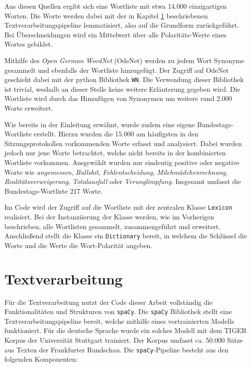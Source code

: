 Aus diesen Quellen ergibt sich eine Wortliste mit etwa 14.000 einzigartigen Worten. 
Die Worte werden dabei mit der in Kapitel \ref{g3textv} beschriebenen Textverarbeitungspipeline lemmatisiert, also auf die Grundform zurückgeführt. 
Bei Überschneidungen wird ein Mittelwert über alle Polaritäts-Werte eines Wortes gebildet. 

Mithilfe des \textit{Open German WordNet} (OdeNet) werden zu jedem Wort Synonyme gesammelt und ebenfalls der Wortliste hinzugefügt. 
Der Zugriff auf OdeNet geschieht dabei mit der python Bibliothek \texttt{WN}. 
Die Verwendung dieser Bibliothek ist trivial, weshalb an dieser Stelle keine weitere Erläuterung gegeben wird. 
Die Wortliste wird durch das Hinzufügen von Synonymen um weitere rund 2.000 Worte erweitert. 

Wie bereits in der Einleitung erwähnt, wurde zudem eine eigene Bundestags-Wortliste erstellt. 
Hierzu wurden die 15.000 am häufigsten in den Sitzungsprotokollen vorkommenden Worte erfasst und analysiert. 
Dabei wurden jedoch nur jene Worte betrachtet, welche nicht bereits in der kombinierten Wortliste vorkommen. 
Ausgewählt wurden nur eindeutig positive oder negative Worte wie \textit{angemessen}, \textit{Bullshit}, \textit{Fehlentscheidung}, \textit{Milchmädchenrechnung}, \textit{Realitätsverweigerung}, \textit{Totalausfall} oder \textit{Verunglimpfung}. 
Insgesamt umfasst die Bundestags-Wortliste 217 Worte. 

Im Code wird der Zugriff auf die Wortliste mit der zentralen Klasse \texttt{Lexicon} realisiert. 
Bei der Instanziierung der Klasse werden, wie im Vorherigen beschrieben, alle Wortlisten gesammelt, zusammengeführt und erweitert. 
Anschließend stellt die Klasse ein \texttt{Dictionary} bereit, in welchem die Schlüssel die Worte und die Werte die Wort-Polarität angeben. 

\section{Textverarbeitung}
\label{g3textv}
Für die Textverarbeitung nutzt der Code dieser Arbeit vollständig die Funktionalitäten und Strukturen von \texttt{spaCy}. 
Die \texttt{spaCy} Bibliothek stellt eine Textverarbeitungspipeline bereit, welche mithilfe eines vortrainierten Modells funktioniert. 
Für die deutsche Sprache wurde ein solches Modell mit dem TIGER Korpus der Universität Stuttgart trainiert. 
Der Korpus umfasst ca. 50.000 Sätze aus Texten der Frankfurter Rundschau. 
Die \texttt{spaCy}-Pipeline besteht aus den folgenden Komponenten: 

